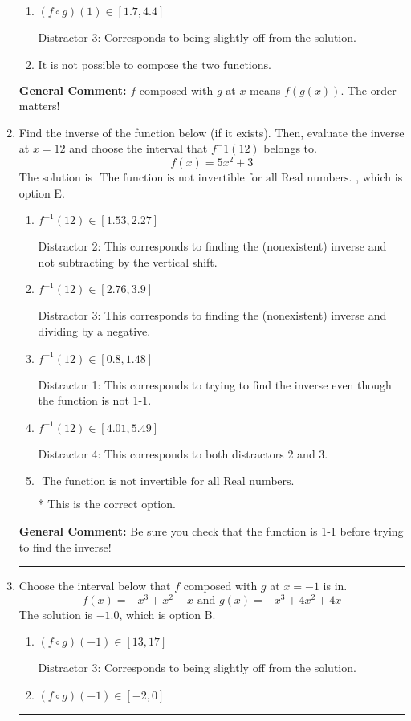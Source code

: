 \documentclass{extbook}[14pt]
\newcommand{\litem}[1]{\item #1

\rule{\textwidth}{0.4pt}}
\begin{document}
\begin{enumerate}
{\begin{enumerate}[label=\Alph*.]
* This is the correct solution
\item \( (f \circ g)(1) \in [1.7, 4.4] \)

 Distractor 3: Corresponds to being slightly off from the solution.
\item \( \text{It is not possible to compose the two functions.} \)


\end{enumerate}

\textbf{General Comment:} $f$ composed with $g$ at $x$ means $f(g(x))$. The order matters!
}
\litem{
Find the inverse of the function below (if it exists). Then, evaluate the inverse at $x = 12$ and choose the interval that $f^-1(12)$ belongs to.
\[ f(x) = 5 x^2 + 3 \]The solution is \( \text{ The function is not invertible for all Real numbers. } \), which is option E.\begin{enumerate}[label=\Alph*.]
\item \( f^{-1}(12) \in [1.53, 2.27] \)

 Distractor 2: This corresponds to finding the (nonexistent) inverse and not subtracting by the vertical shift.
\item \( f^{-1}(12) \in [2.76, 3.9] \)

 Distractor 3: This corresponds to finding the (nonexistent) inverse and dividing by a negative.
\item \( f^{-1}(12) \in [0.8, 1.48] \)

 Distractor 1: This corresponds to trying to find the inverse even though the function is not 1-1. 
\item \( f^{-1}(12) \in [4.01, 5.49] \)

 Distractor 4: This corresponds to both distractors 2 and 3.
\item \( \text{ The function is not invertible for all Real numbers. } \)

* This is the correct option.
\end{enumerate}

\textbf{General Comment:} Be sure you check that the function is 1-1 before trying to find the inverse!
}
\litem{
Choose the interval below that $f$ composed with $g$ at $x=-1$ is in.
\[ f(x) = -x^{3} + x^{2} -x \text{ and } g(x) = -x^{3} +4 x^{2} +4 x \]The solution is \( -1.0 \), which is option B.\begin{enumerate}[label=\Alph*.]
\item \( (f \circ g)(-1) \in [13, 17] \)

 Distractor 3: Corresponds to being slightly off from the solution.
\item \( (f \circ g)(-1) \in [-2, 0] \)


\end{enumerate}}
\end{enumerate}
\end{document}
